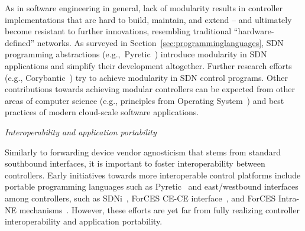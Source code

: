 As in software engineering in general, lack of modularity results in controller 
implementations that are hard to build, maintain, and extend -- and ultimately become resistant to further 
innovations, resembling traditional ``hardware-defined'' networks. As surveyed in Section~\ref{sec:programminglanguages}, 
SDN programming abstractions (e.g.,~Pyretic~\cite{monsanto2013}) introduce modularity in SDN 
applications and simplify their development altogether. Further research efforts (e.g., 
Corybantic~\cite{auyoung2013}) try to achieve modularity in SDN control programs. Other 
contributions towards achieving modular controllers can be expected from other areas of computer science 
(e.g., principles from Operating System~\cite{monaco2013}) and best practices of modern 
cloud-scale software applications.


%
\vspace{2mm}
\noindent \textit{Interoperability and application portability}

Similarly to forwarding device vendor agnosticism that stems from standard southbound interfaces, it is important to foster interoperability between controllers.
Early initiatives towards more interoperable control platforms include portable programming languages such as Pyretic~\cite{monsanto2013} and east/westbound interfaces among controllers, such as SDNi~\cite{yin2012}, ForCES CE-CE interface~\cite{doria2010,wang2011-1}, 
and ForCES Intra-NE mechanisms~\cite{ogawa2013}.
However, these efforts are yet far from fully realizing controller interoperability and application portability.


